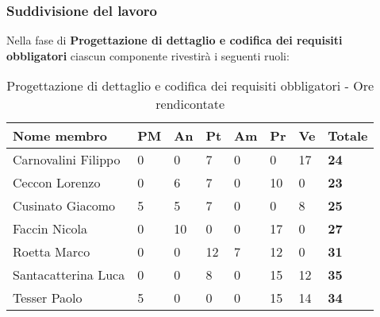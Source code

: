 		\subsubsection{Suddivisione del lavoro} %
		\label{ssub:suddivisione_del_lavoro}
		Nella fase di \textbf{Progettazione di dettaglio e codifica dei requisiti obbligatori} ciascun componente rivestirà i seguenti ruoli: \\
			\begin{table}[!ht]
				\begin{center}
					\begin{tabularx}{0.9\textwidth}{|l|l|l|l|l|l|l|X|}
						\hline
						\textbf{Nome membro} & \textbf{PM} & \textbf{An} & \textbf{Pt} & \textbf{Am} & \textbf{Pr} & \textbf{Ve} & \textbf{Totale} \\
						\hline
						Carnovalini Filippo & 0 & 0 & 7 & 0 & 0 & 17 & \textbf{24} \\
						\hline
						Ceccon Lorenzo & 0 & 6 & 7 & 0 & 10 & 0 & \textbf{23} \\
						\hline
						Cusinato Giacomo & 5 & 5 & 7 & 0 & 0 & 8 & \textbf{25} \\
						\hline
						Faccin Nicola & 0 & 10 & 0 & 0 & 17 & 0 & \textbf{27} \\
						\hline
						Roetta Marco & 0 & 0 & 12 & 7 & 12 & 0 & \textbf{31} \\
						\hline
						Santacatterina Luca & 0 & 0 & 8 & 0 & 15 & 12 & \textbf{35} \\
						\hline
						Tesser Paolo & 5 & 0 & 0 & 0 & 15 & 14 & \textbf{34} \\
						\hline
					\end{tabularx}
				\end{center}
			\caption{Progettazione di dettaglio e codifica dei requisiti obbligatori - Ore rendicontate}
			\end{table}
			
